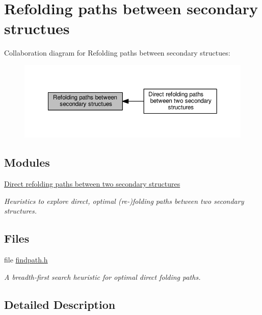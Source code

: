 \hypertarget{group__paths}{}\section{Refolding paths between secondary structues}
\label{group__paths}
Collaboration diagram for Refolding paths between secondary structues\+:
\nopagebreak
\begin{figure}[H]
\begin{center}
\leavevmode
\includegraphics[width=350pt]{group__paths}
\end{center}
\end{figure}
\subsection*{Modules}
\begin{DoxyCompactItemize}
\item 
\hyperlink{group__direct__paths}{Direct refolding paths between two secondary structures}
\begin{DoxyCompactList}\small\item\em Heuristics to explore direct, optimal (re-\/)folding paths between two secondary structures. \end{DoxyCompactList}\end{DoxyCompactItemize}
\subsection*{Files}
\begin{DoxyCompactItemize}
\item 
file \hyperlink{findpath_8h}{findpath.\+h}
\begin{DoxyCompactList}\small\item\em A breadth-\/first search heuristic for optimal direct folding paths. \end{DoxyCompactList}\end{DoxyCompactItemize}


\subsection{Detailed Description}
